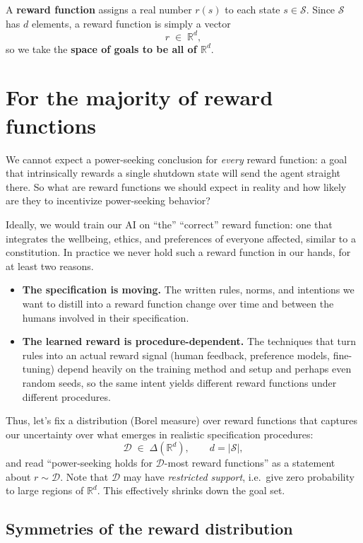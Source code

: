 \documentclass[11pt]{article}
\newcommand{\cS}{\mathcal{S}}
\newcommand{\R}{\mathbb{R}}
\newcommand{\Dist}{\mathcal{D}}    %
\begin{document}
\begin{definition}\label{def:reward}
A \textbf{reward function} assigns a real number $r(s)$ to each state $s\in\cS$. Since
$\cS$ has $d$ elements, a reward function is simply a vector
$$
r \;\in\; \R^{d},
$$
so we take the \textbf{space of goals to be all of $\R^d$}. 
\end{definition}


\section{For the majority of reward functions}

We cannot expect a power-seeking conclusion for \emph{every} reward function: a goal that
intrinsically rewards a single shutdown state will send the agent straight there.
So what are reward functions we should expect in reality and how likely are they to incentivize power-seeking behavior?

Ideally, we would train our AI on ``the'' ``correct'' reward function: one that
integrates the wellbeing, ethics, and preferences of everyone affected, similar to a constitution. In practice we never hold such a reward function in our hands,
for at least two reasons.
\begin{itemize}\itemsep=2pt
  \item \textbf{The specification is moving.} The written rules, norms, and intentions we
  want to distill into a reward function change over time and between the humans involved in their specification.
  \item \textbf{The learned reward is procedure-dependent.} The techniques that turn rules
  into an actual reward signal (human feedback, preference models, fine-tuning) depend
  heavily on the training method and setup and perhaps even random seeds, so the same intent yields different reward
  functions under different procedures.
\end{itemize}

Thus, let's fix a distribution (Borel measure) over reward functions that captures our uncertainty over what emerges in realistic specification procedures:
$$
\Dist \;\in\; \Delta(\R^{d}), \qquad d = |\cS|,
$$
and read ``power-seeking holds for $\Dist$-most reward functions'' as a statement about
$r \sim \Dist$.
Note that $\Dist$ may have \emph{restricted support}, i.e.\ give zero probability to large regions
of $\R^{d}$. This effectively shrinks down the goal set.

\subsection*{Symmetries of the reward distribution}
\end{document}
